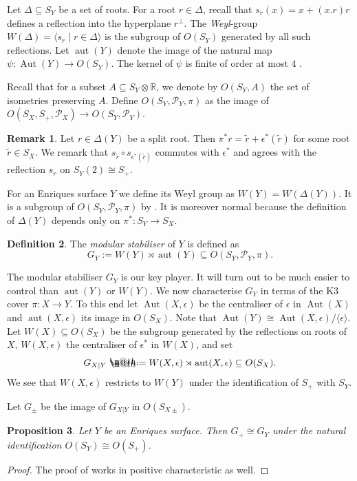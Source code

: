 \documentclass{amsart}
\makeatletter
\theoremstyle{definition}
\newtheorem{definition}{Definition}[section]
\newtheorem{remark}[definition]{Remark}
\theoremstyle{plain}
\newtheorem{proposition}[definition]{Proposition}
\DeclareMathOperator{\Aut}{Aut}
\DeclareMathOperator{\aut}{aut}
\newcommand{\RR}{\mathbb{R}}
\renewcommand{\P}{\mathcal{P}}
\newcommand*{\defeq}{\mathrel{\rlap{%
                     \raisebox{0.3ex}{$\m@th\cdot$}}%
                     \raisebox{-0.3ex}{$\m@th\cdot$}}%
                     =}
\makeatother
\begin{document}
Let $\Delta\subseteq S_Y$ be a set of roots. For a root $r \in \Delta$, recall that $s_r(x) = x + (x.r)r$ defines a reflection into the hyperplane $r^\perp$. The \emph{Weyl}-group $W(\Delta)=\langle s_r \mid r \in \Delta \rangle$ is the subgroup of $O(S_Y)$ generated by all such reflections.
Let $\aut(Y)$ denote the image of the natural map $\psi\colon \Aut(Y) \to O(S_Y)$.
The kernel of $\psi$ is finite of order at most $4$ \cite{mukai_namikawa:numerically_trivial,dolgachev_martin:numericallytrivial}.

Recall that for a subset $A \subseteq S_Y\otimes \RR$, we denote by $O(S_Y,A)$ the set of isometries preserving $A$. Define  $O(S_Y,\P_Y, \pi)$ as the image of $O(S_X,S_+,\P_X) \to O(S_Y,\P_Y)$.

\begin{remark}\label{remark:split_weyl}
Let $r \in \Delta(Y)$ be a split root. Then $\pi^*r=\tilde{r} + \epsilon^*(\tilde{r})$ for some root $\tilde{r} \in S_X$.
We remark that $s_{\tilde{r}}\circ s_{\epsilon^*(\tilde{r})}$ commutes with $\epsilon^*$ and agrees with the reflection $s_{r}$ on $S_Y(2) \cong S_+$.
\end{remark}

For an Enriques surface $Y$ we define its Weyl group as $W(Y)=W(\Delta(Y))$.
It is a subgroup of $O(S_Y,\P_Y, \pi)$ by . It is moreover normal because the definition of $\Delta(Y)$ depends only on $\pi^*\colon S_Y \to  S_X$.
\begin{definition}
The \emph{modular stabiliser} of $Y$ is defined as
\[G_Y := W(Y) \rtimes \aut(Y) \subseteq O(S_Y, \P_Y, \pi).\]
\end{definition}
The modular stabiliser $G_Y$ is our key player. It will turn out to be much easier to control than $\aut(Y)$ or $W(Y)$.
We now characterise $G_Y$ in terms of the K3 cover $\pi\colon X \to Y$.
To this end let $\Aut(X,\epsilon)$ be the centraliser of $\epsilon$ in $\Aut(X)$ and $\aut(X,\epsilon)$ its image in $O(S_X)$. Note that $\Aut(Y) \cong \Aut(X,\epsilon)/\langle \epsilon \rangle$.
Let $W(X)\subseteq O(S_X)$ be the subgroup generated by the reflections on roots of $X$, $W(X,\epsilon)$ the centraliser of $\epsilon^*$ in $W(X)$, and set
\begin{equation}\label{def:GX}
G_{X|Y} \defeq W(X,\epsilon)\rtimes \aut(X,\epsilon) \subseteq O(S_X).
\end{equation}
We see that $W(X,\epsilon)$ restricts to $W(Y)$ under the identification of $S_+$ with $S_Y$.

Let $G_\pm$ be the image of $G_{X|Y}$ in $O(S_{X\pm})$.
\begin{proposition}\label{prop:GYG_+}
Let $Y$ be an Enriques surface. Then $G_+ \cong G_Y$ under the natural identification $O(S_Y)\cong O(S_{+})$.
\end{proposition}
\begin{proof}
The proof of \cite[Proposition 3.2]{brandhorst_shimada:tautaubar} works in positive characteristic as well.
\end{proof}
\end{document}
